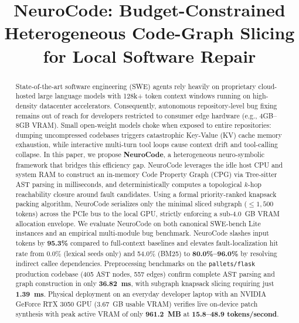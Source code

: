 \documentclass[conference]{IEEEtran}
\begin{document}
\setlength{\abovedisplayskip}{4pt plus 1pt minus 1pt}
\setlength{\belowdisplayskip}{4pt plus 1pt minus 1pt}

\title{NeuroCode: Budget-Constrained Heterogeneous Code-Graph Slicing for Local Software Repair}

\author{
}

\maketitle

\begin{abstract}
State-of-the-art software engineering (SWE) agents rely heavily on proprietary cloud-hosted large language models with 128k+ token context windows running on high-density datacenter accelerators. Consequently, autonomous repository-level bug fixing remains out of reach for developers restricted to consumer edge hardware (e.g., 4GB--8GB VRAM). Small open-weight models choke when exposed to entire repositories: dumping uncompressed codebases triggers catastrophic Key-Value (KV) cache memory exhaustion, while interactive multi-turn tool loops cause context drift and tool-calling collapse. In this paper, we propose \textbf{NeuroCode}, a heterogeneous neuro-symbolic framework that bridges this efficiency gap. NeuroCode leverages the idle host CPU and system RAM to construct an in-memory Code Property Graph (CPG) via Tree-sitter AST parsing in milliseconds, and deterministically computes a topological $k$-hop reachability closure around fault candidates. Using a formal priority-ranked knapsack packing algorithm, NeuroCode serializes only the minimal sliced subgraph ($\le 1,500$ tokens) across the PCIe bus to the local GPU, strictly enforcing a sub-4.0~GB VRAM allocation envelope. We evaluate NeuroCode on both canonical SWE-bench Lite instances and an empirical multi-module bug benchmark. NeuroCode slashes input tokens by \textbf{95.3\%} compared to full-context baselines and elevates fault-localization hit rate from 0.0\% (lexical seeds only) and 54.0\% (BM25) to \textbf{80.0\%--96.0\%} by resolving indirect callee dependencies. Preprocessing benchmarks on the \texttt{pallets/flask} production codebase (405 AST nodes, 557 edges) confirm complete AST parsing and graph construction in only \textbf{36.82~ms}, with subgraph knapsack slicing requiring just \textbf{1.39~ms}. Physical deployment on an everyday developer laptop with an NVIDIA GeForce RTX 3050 GPU (3.67~GB usable VRAM) verifies live on-device patch synthesis with peak active VRAM of only \textbf{961.2~MB} at \textbf{15.8--48.9 tokens/second}.
\end{abstract}
\end{document}
